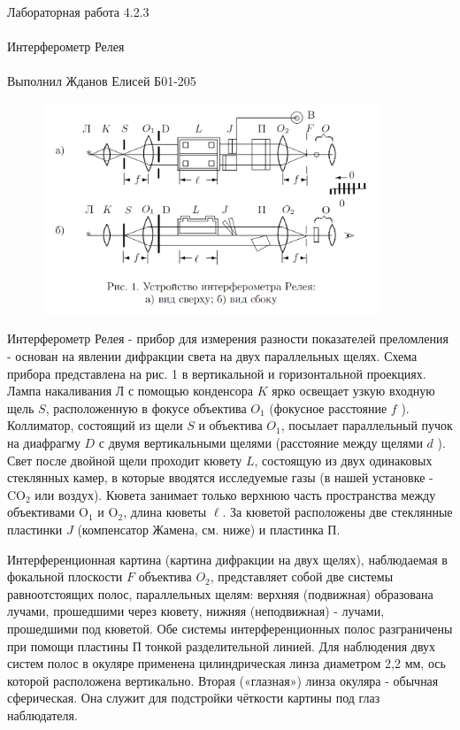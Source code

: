 \documentclass{astroedu-lab}
\begin{document}
\begin{problem}{\huge Лабораторная работа 4.2.3\\\\Интерферометр Релея\\\\Выполнил Жданов Елисей Б01-205}
\begin{figure}[!h]
	\centering
	\includegraphics[width=0.9\textwidth]{установка.png}
	\label{fig:boiler}
\end{figure}

Интерферометр Релея - прибор для измерения разности показателей преломления - основан на явлении дифракции света на двух параллельных щелях. Схема прибора представлена на рис. 1 в вертикальной и горизонтальной проекциях. Лампа накаливания Л с помощью конденсора $K$ ярко освещает узкую входную щель $S$, расположенную в фокусе объектива $O_1$ (фокусное расстояние $f$ ). Коллиматор, состоящий из щели $S$ и объектива $O_1$, посылает параллельный пучок на диафрагму $D$ с двумя вертикальными щелями (расстояние между щелями $d$ ). Свет после двойной щели проходит кювету $L$, состоящую из двух одинаковых стеклянных камер, в которые вводятся исследуемые газы (в нашей установке - $\mathrm{CO}_2$ или воздух). Кювета занимает только верхнюю часть пространства между объективами $\mathrm{O}_1$ и $\mathrm{O}_2$, длина кюветы $\ell$. За кюветой расположены две стеклянные пластинки $J$ (компенсатор Жамена, см. ниже) и пластинка П.

Интерференционная картина (картина дифракции на двух щелях), наблюдаемая в фокальной плоскости $F$ объектива $O_2$, представляет собой две системы равноотстоящих полос, параллельных щелям: верхняя (подвижная) образована лучами, прошедшими через кювету, нижняя (неподвижная) - лучами, прошедшими под кюветой. Обе системы интерференционных полос разграничены при помощи пластины П тонкой разделительной линией. Для наблюдения двух систем полос в окуляре применена цилиндрическая линза диаметром 2,2 мм, ось которой расположена вертикально. Вторая («глазная») линза окуляра - обычная сферическая. Она служит для подстройки чёткости картины под глаз наблюдателя.


\end{problem}
\end{document}
